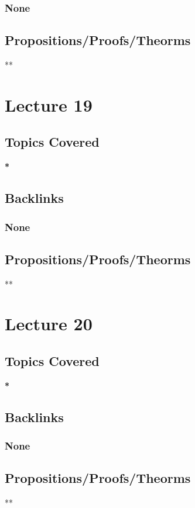 \documentclass[11pt]{article}
\begin{document}
\subsubsection*{None}
\label{sec:org73cc427}
\subsection*{Propositions/Proofs/Theorms}
\label{sec:org6d424d9}
**

\section*{Lecture 19}
\label{sec:org7dcf866}
\subsection*{Topics Covered}
\label{sec:org8923e7f}
\textbf{*}
\subsection*{Backlinks}
\label{sec:org8b9230d}
\subsubsection*{None}
\label{sec:org22f4166}
\subsection*{Propositions/Proofs/Theorms}
\label{sec:org625766c}
**

\section*{Lecture 20}
\label{sec:org2d431f9}
\subsection*{Topics Covered}
\label{sec:org1b4db12}
\textbf{*}
\subsection*{Backlinks}
\label{sec:org05fa1a0}
\subsubsection*{None}
\label{sec:orga480c8b}
\subsection*{Propositions/Proofs/Theorms}
\label{sec:org8fc883e}
**
\end{document}
